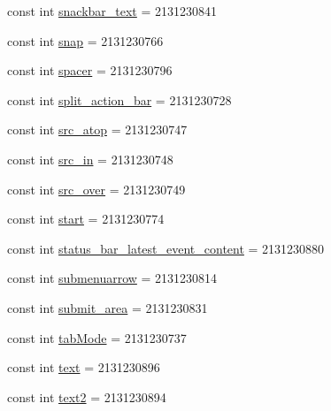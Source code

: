 \begin{DoxyCompactItemize}
\item 
const int \mbox{\hyperlink{class_f_w_p_s___app_1_1_droid_1_1_resource_1_1_id_ad4d8076210556f4364e1ae1096e397d4}{snackbar\+\_\+text}} = 2131230841
\item 
const int \mbox{\hyperlink{class_f_w_p_s___app_1_1_droid_1_1_resource_1_1_id_ae2ce16e8c24b5fe5fdb363740ac506b8}{snap}} = 2131230766
\item 
const int \mbox{\hyperlink{class_f_w_p_s___app_1_1_droid_1_1_resource_1_1_id_ab7d62129a9e514aa3a91298233a50ea1}{spacer}} = 2131230796
\item 
const int \mbox{\hyperlink{class_f_w_p_s___app_1_1_droid_1_1_resource_1_1_id_aac0f29b13a721589da5efdd5aa9670b0}{split\+\_\+action\+\_\+bar}} = 2131230728
\item 
const int \mbox{\hyperlink{class_f_w_p_s___app_1_1_droid_1_1_resource_1_1_id_a9ce1e9e370052a74219c9f2ab6172e55}{src\+\_\+atop}} = 2131230747
\item 
const int \mbox{\hyperlink{class_f_w_p_s___app_1_1_droid_1_1_resource_1_1_id_a705af0bcb8a7046b5e39b60c87138969}{src\+\_\+in}} = 2131230748
\item 
const int \mbox{\hyperlink{class_f_w_p_s___app_1_1_droid_1_1_resource_1_1_id_a7c9e881231f06687cbbd659c4b33add8}{src\+\_\+over}} = 2131230749
\item 
const int \mbox{\hyperlink{class_f_w_p_s___app_1_1_droid_1_1_resource_1_1_id_ae77f0420b4ba2caf608fc59285dab9fe}{start}} = 2131230774
\item 
const int \mbox{\hyperlink{class_f_w_p_s___app_1_1_droid_1_1_resource_1_1_id_a53c2748082d103bfda96a8829fe5d228}{status\+\_\+bar\+\_\+latest\+\_\+event\+\_\+content}} = 2131230880
\item 
const int \mbox{\hyperlink{class_f_w_p_s___app_1_1_droid_1_1_resource_1_1_id_ad694ec221478c84f5c93f6c643dd69b6}{submenuarrow}} = 2131230814
\item 
const int \mbox{\hyperlink{class_f_w_p_s___app_1_1_droid_1_1_resource_1_1_id_a15dfa52fabc81102429a7773c3345ae1}{submit\+\_\+area}} = 2131230831
\item 
const int \mbox{\hyperlink{class_f_w_p_s___app_1_1_droid_1_1_resource_1_1_id_a375928ba0d4c4ac46ef127f193882f75}{tab\+Mode}} = 2131230737
\item 
const int \mbox{\hyperlink{class_f_w_p_s___app_1_1_droid_1_1_resource_1_1_id_a1ee91c45e46c8560dbe79a7be26d20f0}{text}} = 2131230896
\item 
const int \mbox{\hyperlink{class_f_w_p_s___app_1_1_droid_1_1_resource_1_1_id_a34dba76c73a0d15363171b4be5f7da46}{text2}} = 2131230894

\end{DoxyCompactItemize}
